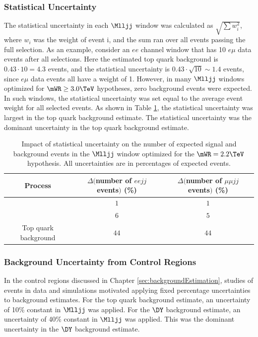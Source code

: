 \subsubsection{Statistical Uncertainty}
\label{sec:statUnc}
The statistical uncertainty in each $\Mlljj$ window was calculated as $\sqrt{\sum w_{i}^{2}}$, where 
$w_{i}$ was the weight of event i, and the sum ran over all events passing the full selection.  As an 
example, consider an $ee$ channel window that has 10 $e\mu$ data events after all selections.  Here 
the estimated top quark background is $0.43 \cdot 10 = 4.3$ events, and the statistical uncertainty is 
$0.43 \cdot \sqrt{10} \sim 1.4$ events, since $e\mu$ data events all have a weight of 1.  However, in 
many $\Mlljj$ windows optimized for $\mWR \geq 3.0\TeV$ hypotheses, zero background events were expected.  
In such windows, the statistical uncertainty was set equal to the average event weight for all selected 
events.  As shown in Table \ref{tab:impactOfStatUncert}, the statistical uncertainty was largest in the 
top quark background estimate.  The statistical uncertainty was the dominant uncertainty in the top 
quark background estimate.

\begin{table}[ht]
	\caption{Impact of statistical uncertainty on the number of expected signal and background events in the $\Mlljj$ 
		window optimized for the $\mWR = 2.2\TeV$ hypothesis.  All uncertainties are in percentages of expected events.}
  \label{tab:impactOfStatUncert}
  \centering
    \begin{tabular}{c|c|c}
		Process & $\Delta($number of $eejj$ events$)$ (\%) & $\Delta($number of $\mu\mu jj$ events$)$ (\%)  \\
      \hline
	  \WR & $1$ & $1$ \\
	  \DY & $6$ & $5$ \\
	 Top quark background & $44$ & $44$  \\
  \hline
  \end{tabular}
\end{table}

\subsubsection{Background Uncertainty from Control Regions}
\label{sec:bkgndNormUnc}
In the control regions discussed in Chapter \ref{sec:backgroundEstimation}, studies of events in 
data and simulations motivated applying fixed percentage uncertainties to background estimates.  For 
the top quark background estimate, an uncertainty of 10\% constant in $\Mlljj$ was applied.  For the 
$\DY$ background estimate, an uncertainty of 40\% constant in $\Mlljj$ was applied.  This was the 
dominant uncertainty in the $\DY$ background estimate.

